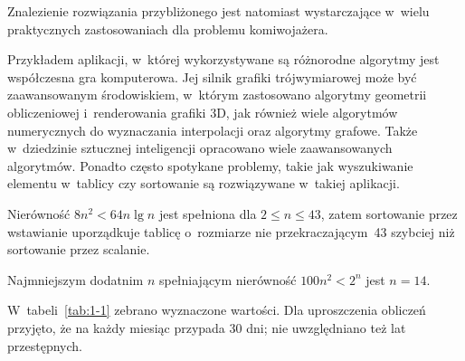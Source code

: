Znalezienie rozwiązania przybliżonego jest natomiast wystarczające w~wielu praktycznych zastosowaniach dla problemu komiwojażera.


\exercise %
Przykładem aplikacji, w~której wykorzystywane są różnorodne algorytmy jest współczesna gra komputerowa. Jej silnik grafiki trójwymiarowej może być zaawansowanym środowiskiem, w~którym zastosowano algorytmy geometrii obliczeniowej i~renderowania grafiki 3D, jak również wiele algorytmów numerycznych do wyznaczania interpolacji oraz algorytmy grafowe. Także w~dziedzinie sztucznej inteligencji opracowano wiele zaawansowanych algorytmów. Ponadto często spotykane problemy, takie jak wyszukiwanie elementu w~tablicy czy sortowanie są rozwiązywane w~takiej aplikacji.

\exercise %
Nierówność $8n^2<64n\lg n$ jest spełniona dla $2\le n\le43$, zatem sortowanie przez wstawianie uporządkuje tablicę o~rozmiarze nie przekraczającym~43 szybciej niż sortowanie przez scalanie.

\exercise %
Najmniejszym dodatnim $n$ spełniającym nierówność $100n^2<2^n$ jest $n=14$.

\problems

W~tabeli~\ref{tab:1-1} zebrano wyznaczone wartości. Dla uproszczenia obliczeń przyjęto, że na każdy miesiąc przypada 30 dni; nie uwzględniano też lat przestępnych.

